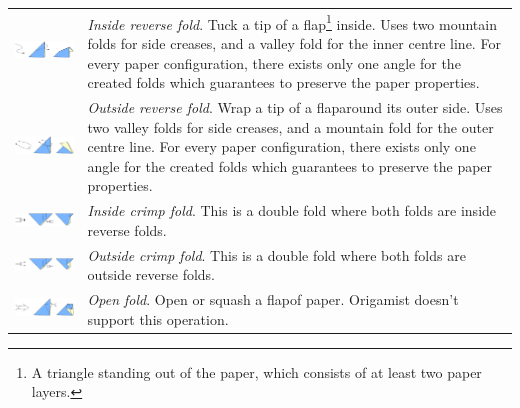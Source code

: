 \begin{savenotes}
\begin{longtable}{lp{5.5cm}}
\includegraphics[width=7.5cm]{images/folds_reverse_inside} & \emph{Inside reverse fold}. Tuck a tip of a flap\footnote{A triangle standing out of the paper, which consists of at least two paper layers.} inside. Uses two mountain folds for side creases, and a valley fold for the inner centre line. For every paper configuration, there exists only one angle for the created folds which guarantees to preserve the paper properties.\\
\includegraphics[width=7.5cm]{images/folds_reverse_outside} & \emph{Outside reverse fold}. Wrap a tip of a flap\footnotemark[\value{footnote}] around its outer side. Uses two valley folds for side creases, and a mountain fold for the outer centre line. For every paper configuration, there exists only one angle for the created folds which guarantees to preserve the paper properties.\\
\includegraphics[width=7.5cm]{images/folds_crimp_inside} & \emph{Inside crimp fold}. This is a double fold where both folds are inside reverse folds.\\
\includegraphics[width=7.5cm]{images/folds_crimp_outside} & \emph{Outside crimp fold}. This is a double fold where both folds are outside reverse folds.\\
\includegraphics[width=7.5cm]{images/folds_open} & \emph{Open fold}. Open or squash a flap\footnotemark[\value{footnote}] of paper. Origamist doesn't support this operation.\\

\end{longtable}
\end{savenotes}
